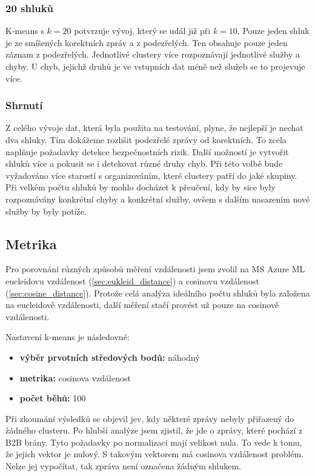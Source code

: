 \documentclass[thesis=M,czech]{FITthesis}[2012/10/20]
\begin{document}
				\subsubsection{20 shluků}
				K-means s $k = 20$ potvrzuje vývoj, který se udál již při $k = 10$. Pouze jeden shluk je ze smíšených korektních zpráv a z podezřelých. Ten obsahuje pouze jeden záznam z podezřelých. Jednotlivé clustery více rozpoznávají jednotlivé služby a chyby. U chyb, jejichž druhů je ve vstupních dat méně než služeb se to projevuje více.
				
				\subsubsection{Shrnutí}
					Z celého vývoje dat, která byla použita na testování, plyne, že nejlepší je nechat dva shluky. Tím dokážeme rozlišit podezřelé zprávy od korektních. To zcela naplňuje požadavky detekce bezpečnostních rizik. Další možností je vytvořit shluků více a pokusit se i detekovat různé druhy chyb. Při této volbě bude vyžadováno více starostí s organizováním, které clustery patří do jaké skupiny. Při velkém počtu shluků by mohlo docházet k přeučení, kdy by sice byly rozpoznávány konkrétní chyby a konkrétní služby, ovšem s dalším nasazením nové služby by byly potíže.
		
		\subsection{Metrika}
			Pro porovnání různých způsobů měření vzdálenosti jsem zvolil na MS Azure ML eucleidovu vzdálenost (\ref{sec:eukleid_distance}) a cosinovu vzdálenost (\ref{sec:cosine_distance}). Protože celá analýza ideálního počtu shluků byla založena na eucleidově vzdálenosti, další měření stačí provést už pouze na cosinově vzdálenosti.
			
			Nastavení k-means je následovné:
			\begin{itemize} 
				\item \textbf{výběr prvotních středových bodů: } náhodný
				\item \textbf{metrika: } cosinova vzdálenost
				\item \textbf{počet běhů: } 100		
			\end{itemize}
		
			Při zkoumání výsledků se objevil jev, kdy některé zprávy nebyly přiřazený do žádného clusteru. Po hlubší analýze jsem zjistil, že jde o zprávy, které pochází z B2B brány. Tyto požadavky po normalizaci mají velikost nula. To vede k tomu, že jejich vektor je nulový. S takovým vektorem má cosinova vzdálenost problém. Nelze jej vypočítat, tak zpráva není označena žádným shlukem.
			
\end{document}
